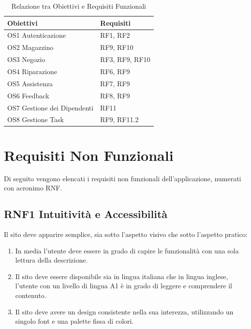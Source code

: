 \documentclass{report}
\begin{document}
\begin{table}[h]
\begin{center} %
	\centering
	\begin{tabular}{ |p{4cm}|p{4cm}|  }
		\hline
		\centering Obiettivi & \qquad\qquad Requisiti \\ %
		\hline
		OS1 Autenticazione & RF1, RF2 \\
		\hline
		OS2 Magazzino & RF9, RF10 \\
		\hline
		OS3 Negozio &
		RF3, RF9, RF10 \\
		\hline
		OS4 Riparazione & RF6, RF9\\
		\hline
		OS5 Assistenza & RF7, RF9 \\
		\hline
		OS6 Feedback & RF8, RF9 \\
		\hline
		OS7 Gestione dei Dipendenti & RF11 \\
		\hline
		OS8 Gestione Task & RF9, RF11.2 \\
		\hline
	\end{tabular}
\caption{Relazione tra Obiettivi e Requisiti Funzionali}
\end{center}
\end{table}

\pagebreak


\section{Requisiti Non Funzionali}
Di seguito vengono elencati i requisiti non funzionali dell’applicazione, numerati con acronimo RNF.

\subsection*{RNF1 Intuitività e Accessibilità}
Il sito deve apparire semplice, sia sotto l'aspetto visivo che sotto l'aspetto pratico:
\begin{enumerate}
	\item In media l’utente deve essere in grado di capire le funzionalità con una sola lettura della descrizione.
	\item Il sito deve essere disponibile sia in lingua italiana che in lingua inglese, l’utente con un livello di lingua A1 è in grado di leggere e comprendere il contenuto.
	\item Il sito deve avere un design consistente nella sua interezza, utilizzando un singolo font e una palette fissa di colori.
\end{enumerate}
\end{document}
